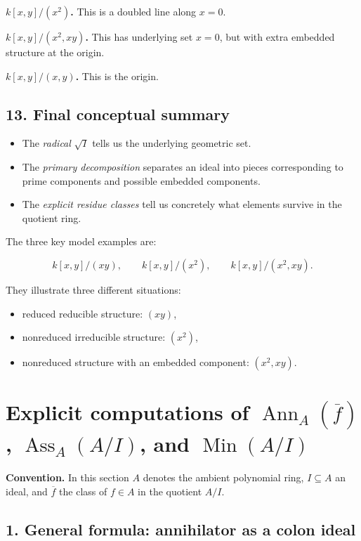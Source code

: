 \documentclass[12pt,a4paper]{article}
\theoremstyle{notespace}
\DeclareMathOperator{\Ass}{Ass}
\DeclareMathOperator{\Ann}{Ann}
\DeclareMathOperator{\Min}{Min}
\begin{document}
\textbf{\(k[x,y]/(x^2)\).}
This is a doubled line along \(x=0\).

\textbf{\(k[x,y]/(x^2,xy)\).}
This has underlying set \(x=0\), but with extra embedded structure at the origin.

\textbf{\(k[x,y]/(x,y)\).}
This is the origin.

\subsection*{13. Final conceptual summary}

\begin{itemize}
	\item The \emph{radical} \(\sqrt I\) tells us the underlying geometric set.
	\item The \emph{primary decomposition} separates an ideal into pieces corresponding to prime components and possible embedded components.
	\item The \emph{explicit residue classes} tell us concretely what elements survive in the quotient ring.
\end{itemize}

The three key model examples are:

\[
k[x,y]/(xy),\qquad k[x,y]/(x^2),\qquad k[x,y]/(x^2,xy).
\]

They illustrate three different situations:

\begin{itemize}
	\item reduced reducible structure: \((xy)\),
	\item nonreduced irreducible structure: \((x^2)\),
	\item nonreduced structure with an embedded component: \((x^2,xy)\).
\end{itemize}

\section*{Explicit computations of \(\Ann_A(\overline f)\), \(\Ass_A(A/I)\), and \(\Min(A/I)\)}

\textbf{Convention.}
In this section \(A\) denotes the ambient polynomial ring, \(I\subseteq A\) an ideal, and \(\overline f\) the class of \(f\in A\) in the quotient \(A/I\).

\subsection*{1. General formula: annihilator as a colon ideal}
\end{document}
